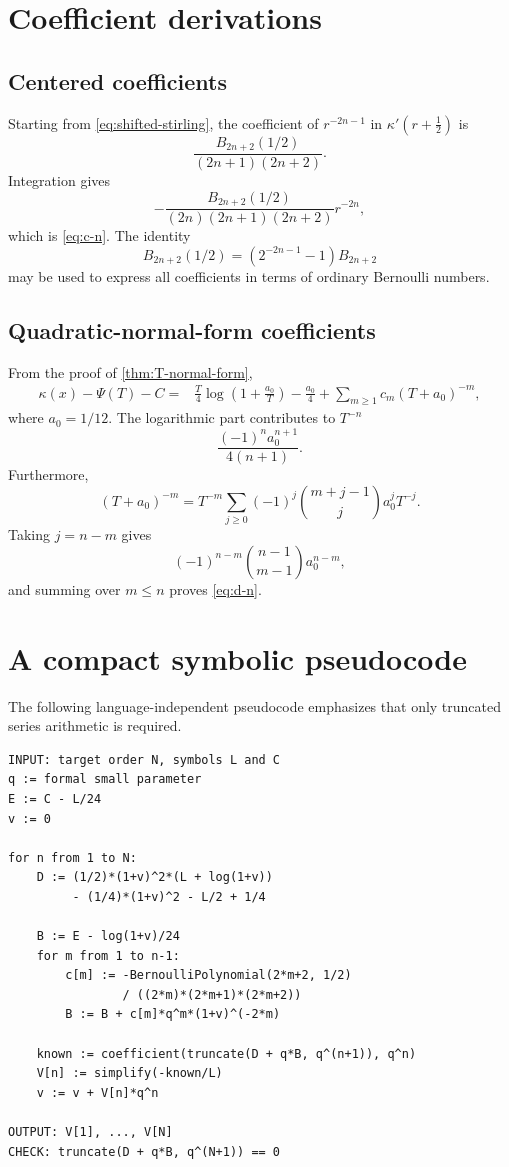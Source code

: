 \documentclass[11pt,a4paper]{article}
\numberwithin{equation}{section}
\theoremstyle{remark}
\begin{document}
\appendix

\section{Coefficient derivations}
\label{app:coefficients}

\subsection{Centered coefficients}

Starting from \cref{eq:shifted-stirling}, the coefficient of
\(r^{-2n-1}\) in \(\kappa'(r+\tfrac12)\) is
\[
\frac{B_{2n+2}(1/2)}{(2n+1)(2n+2)}.
\]
Integration gives
\[
-\frac{B_{2n+2}(1/2)}{(2n)(2n+1)(2n+2)}r^{-2n},
\]
which is \cref{eq:c-n}.  The identity
\[
B_{2n+2}(1/2)=\left(2^{-2n-1}-1\right)B_{2n+2}
\]
may be used to express all coefficients in terms of ordinary Bernoulli
numbers.

\subsection{Quadratic-normal-form coefficients}

From the proof of \cref{thm:T-normal-form},
\begin{align*}
\kappa(x)-\Psi(T)-C
={}&\frac{T}{4}\log\left(1+\frac{a_0}{T}\right)-\frac{a_0}{4}
+\sum_{m\ge1}c_m(T+a_0)^{-m},
\end{align*}
where \(a_0=1/12\).  The logarithmic part contributes to \(T^{-n}\)
\[
\frac{(-1)^na_0^{n+1}}{4(n+1)}.
\]
Furthermore,
\[
(T+a_0)^{-m}=T^{-m}
\sum_{j\ge0}(-1)^j\binom{m+j-1}{j}a_0^jT^{-j}.
\]
Taking \(j=n-m\) gives
\[
(-1)^{n-m}\binom{n-1}{m-1}a_0^{n-m},
\]
and summing over \(m\le n\) proves \cref{eq:d-n}.

\section{A compact symbolic pseudocode}
\label{app:pseudocode}

The following language-independent pseudocode emphasizes that only truncated
series arithmetic is required.

\begin{lstlisting}[caption={Formal recurrence for the canonical coefficients.}]
INPUT: target order N, symbols L and C
q := formal small parameter
E := C - L/24
v := 0

for n from 1 to N:
    D := (1/2)*(1+v)^2*(L + log(1+v))
         - (1/4)*(1+v)^2 - L/2 + 1/4

    B := E - log(1+v)/24
    for m from 1 to n-1:
        c[m] := -BernoulliPolynomial(2*m+2, 1/2)
                / ((2*m)*(2*m+1)*(2*m+2))
        B := B + c[m]*q^m*(1+v)^(-2*m)

    known := coefficient(truncate(D + q*B, q^(n+1)), q^n)
    V[n] := simplify(-known/L)
    v := v + V[n]*q^n

OUTPUT: V[1], ..., V[N]
CHECK: truncate(D + q*B, q^(N+1)) == 0
\end{lstlisting}
\end{document}
